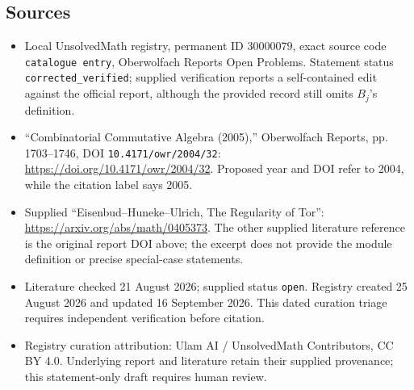 \documentclass[11pt]{article}
\begin{document}
\subsection{Sources}
\begin{itemize}
\item Local UnsolvedMath registry, permanent ID \(30000079\), exact source code \texttt{catalogue entry}, Oberwolfach Reports Open Problems. Statement status \texttt{corrected\_verified}; supplied verification reports a self-contained edit against the official report, although the provided record still omits \(B_j\)'s definition.
\item ``Combinatorial Commutative Algebra (2005),'' Oberwolfach Reports, pp. 1703--1746, DOI \texttt{10.4171/owr/2004/32}: \url{https://doi.org/10.4171/owr/2004/32}. Proposed year and DOI refer to 2004, while the citation label says 2005.
\item Supplied ``Eisenbud--Huneke--Ulrich, The Regularity of Tor'': \url{https://arxiv.org/abs/math/0405373}. The other supplied literature reference is the original report DOI above; the excerpt does not provide the module definition or precise special-case statements.
\item Literature checked 21 August 2026; supplied status \texttt{open}. Registry created 25 August 2026 and updated 16 September 2026. This dated curation triage requires independent verification before citation.
\item Registry curation attribution: Ulam AI / UnsolvedMath Contributors, CC BY 4.0. Underlying report and literature retain their supplied provenance; this statement-only draft requires human review.
\end{itemize}
\end{document}
